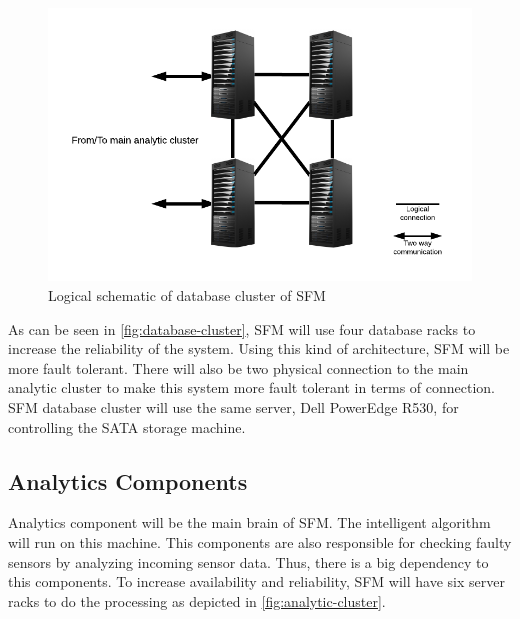 \begin{figure}[hb!]
\centering
\includegraphics[]{6-hardware/images/db-cluster.png}
\caption{Logical schematic of database cluster of SFM}
\label{fig:database-cluster}
\end{figure}

As can be seen in \autoref{fig:database-cluster}, SFM will use four database racks to increase the reliability of the system. Using this kind of architecture, SFM will be more fault tolerant. There will also be two physical connection to the main analytic cluster to make this system more fault tolerant in terms of connection. SFM database cluster will use the same server, Dell PowerEdge R530, for controlling the SATA storage machine.





\subsection{Analytics Components}
\label{subsec:analytics}
Analytics component will be the main brain of SFM. The intelligent algorithm will run on this machine. This components are also responsible for checking faulty sensors by analyzing incoming sensor data. Thus, there is a big dependency to this components. To increase availability and reliability, SFM will have six server racks to do the processing as depicted in \autoref{fig:analytic-cluster}.

